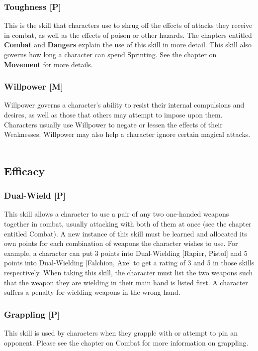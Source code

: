 \documentclass[oneside]{book}
\begin{document}
\begin{multicols}{2}
\subsubsection{Toughness [P]}
This is the skill that characters use to shrug off the effects of attacks they receive in combat, as well as the effects of poison or other hazards. The chapters entitled \textbf{Combat} and \textbf{Dangers} explain the use of this skill in more detail. This skill also governs how long a character can spend Sprinting. See the chapter on \textbf{Movement} for more details.

\subsubsection{Willpower [M]}
Willpower governs a character's ability to resist their internal compulsions and desires, as well as those that others may attempt to impose upon them. Characters usually use Willpower to negate or lessen the effects of their Weaknesses. Willpower may also help a character ignore certain magical attacks.
\\
\\
\subsection{Efficacy}
\subsubsection{Dual-Wield [P]}
This skill allows a character to use a pair of any two one-handed weapons together in combat, usually attacking with both of them at once (see the chapter entitled Combat). A new instance of this skill must be learned and allocated its own points for each combination of weapons the character wishes to use. For example, a character can put 3 points into Dual-Wielding [Rapier, Pistol] and 5 points into Dual-Wielding [Falchion, Axe] to get a rating of 3 and 5 in those skills respectively. When taking this skill, the character must list the two weapons such that the weapon they are wielding in their main hand is listed first. A character suffers a penalty for wielding weapons in the wrong hand.

\subsubsection{Grappling [P]}
This skill is used by characters when they grapple with or attempt to pin an opponent. Please see the chapter on Combat for more information on grappling.


\end{multicols}
\end{document}
